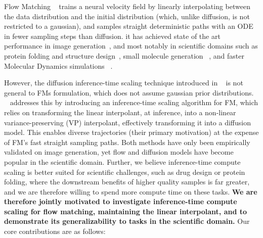 \documentclass{article} %
\begin{document}
Flow Matching ~\cite{lipman2023fm} trains a neural velocity field by linearly interpolating between the data distribution and the initial distribution (which, unlike diffusion, is not restricted to a gaussian), and samples straight deterministic paths with an ODE in fewer sampling steps than diffusion. it has achieved state of the art performance in image generation~\cite{flux}, and most notably in scientific domains such as protein folding and structure design~\cite{foldflow2}, small molecule generation ~\cite{flowmol3}, and faster Molecular Dynamics simulations ~\cite{nam2025flowmatchingacceleratedsimulation}.

However, the diffusion inference-time scaling technique introduced in ~\cite{ma2025diffits}  is not general to FMs formulation, which does not assume gaussian prior distributions. ~\cite{kim2025flowits} addresses this by introducing an inference-time scaling algorithm for FM, which relies on transforming the linear interpolant, at inference, into a non-linear variance-preserving (VP) interpolant, effectively transforming it into a diffusion model. This enables diverse trajectories (their primary motivation) at the expense of FM's fast straight sampling paths. Both methods have only been empirically validated on image generation, yet flow and diffusion models have become popular in the scientific domain. Further, we believe inference-time compute scaling is better suited for scientific challenges, such as drug design or protein folding, where the downstream benefits of higher quality samples is far greater, and we are therefore willing to spend more compute time on these tasks.
\textbf{We are therefore jointly motivated to investigate inference-time compute scaling for flow matching, maintaining the linear interpolant, and to demonstrate its generalizability to tasks in the scientific domain.} Our core contributions are as follows:
\end{document}
